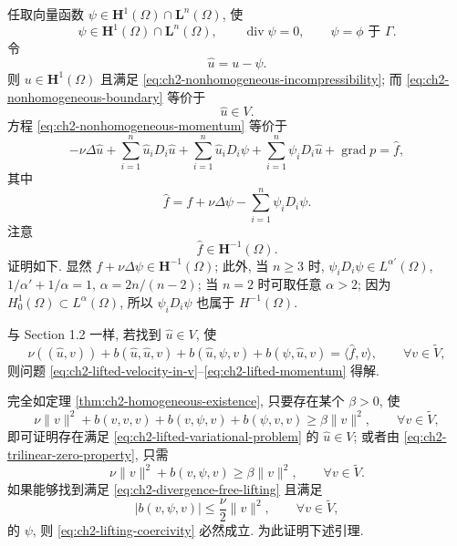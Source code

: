 \begin{Proof}
任取向量函数 $\psi\in\mathbf H^1(\Omega)\cap\mathbf L^n(\Omega)$, 使
\begin{equation}
\psi\in\mathbf H^1(\Omega)\cap\mathbf L^n(\Omega),
\qquad\operatorname{div}\psi=0,
\qquad\psi=\phi\text{ 于 }\Gamma.
\label{eq:ch2-divergence-free-lifting}
\end{equation}
令
\[
\widehat u=u-\psi.
\]
\hypertarget{chapter-02-page-132}{}
则 $u\in\mathbf H^1(\Omega)$ 且满足 \eqref{eq:ch2-nonhomogeneous-incompressibility}; 而 \eqref{eq:ch2-nonhomogeneous-boundary} 等价于
\begin{equation}
\widehat u\in V.
\label{eq:ch2-lifted-velocity-in-v}
\end{equation}
方程 \eqref{eq:ch2-nonhomogeneous-momentum} 等价于
\begin{equation}
-\nu\Delta\widehat u
+\sum_{i=1}^{n}\widehat u_iD_i\widehat u
+\sum_{i=1}^{n}\widehat u_iD_i\psi
+\sum_{i=1}^{n}\psi_iD_i\widehat u
+\operatorname{grad}p=\widehat f,
\label{eq:ch2-lifted-momentum}
\end{equation}
其中
\[
\widehat f=f+\nu\Delta\psi-\sum_{i=1}^{n}\psi_iD_i\psi.
\]
注意
\[
\widehat f\in\mathbf H^{-1}(\Omega).
\]
证明如下. 显然 $f+\nu\Delta\psi\in\mathbf H^{-1}(\Omega)$; 此外, 当 $n\geq3$ 时, $\psi_iD_i\psi\in L^{\alpha'}(\Omega)$, $1/\alpha'+1/\alpha=1$, $\alpha=2n/(n-2)$; 当 $n=2$ 时可取任意 $\alpha>2$; 因为 $H_0^1(\Omega)\subset L^\alpha(\Omega)$, 所以 $\psi_iD_i\psi$ 也属于 $H^{-1}(\Omega)$.

与 Section 1.2 一样, 若找到 $\widehat u\in V$, 使
\begin{equation}
\nu((\widehat u,v))+b(\widehat u,\widehat u,v)
+b(\widehat u,\psi,v)+b(\psi,\widehat u,v)
=\langle\widehat f,v\rangle,
\qquad\forall v\in\widetilde V,
\label{eq:ch2-lifted-variational-problem}
\end{equation}
则问题 \eqref{eq:ch2-lifted-velocity-in-v}--\eqref{eq:ch2-lifted-momentum} 得解.

完全如定理 \ref{thm:ch2-homogeneous-existence}, 只要存在某个 $\beta>0$, 使
\[
\nu\lVert v\rVert^2+b(v,v,v)+b(v,\psi,v)+b(\psi,v,v)
\geq\beta\lVert v\rVert^2,
\qquad\forall v\in\widetilde V,
\]
即可证明存在满足 \eqref{eq:ch2-lifted-variational-problem} 的 $\widehat u\in V$; 或者由 \eqref{eq:ch2-trilinear-zero-property}, 只需
\begin{equation}
\nu\lVert v\rVert^2+b(v,\psi,v)
\geq\beta\lVert v\rVert^2,
\qquad\forall v\in\widetilde V.
\label{eq:ch2-lifting-coercivity}
\end{equation}
如果能够找到满足 \eqref{eq:ch2-divergence-free-lifting} 且满足
\begin{equation}
|b(v,\psi,v)|\leq\frac\nu2\lVert v\rVert^2,
\qquad\forall v\in\widetilde V,
\label{eq:ch2-lifting-smallness}
\end{equation}
的 $\psi$, 则 \eqref{eq:ch2-lifting-coercivity} 必然成立. 为此证明下述引理.


\end{Proof}
